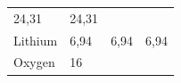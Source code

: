 {\begin{tabular}[t]{|l|l|l|l|}
    
        24,31 &
    
    
        24,31%
     \tabularnewline\cline{1-1}\cline{2-2}\cline{3-3}\cline{4-4}
    
    
        Lithium &
    
    
        6,94 &
    
    
        6,94 &
    
    
        6,94%
     \tabularnewline\cline{1-1}\cline{2-2}\cline{3-3}\cline{4-4}
    
    
        Oxygen &
    
    
        16 &
    

\end{tabular}}
